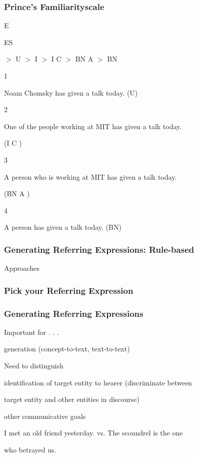 \documentclass[compress,color=usenames]{beamer}
\begin{document}
\begin{frame}
\frametitle{Prince's Familiarityscale}

E

ES

$>$ U $>$ I $>$ I C $>$ BN A $>$ BN

1

Noam Chomsky has given a talk today. (U)

2

One of the people working at MIT has given a talk today.

(I C )

3

A person who is working at MIT has given a talk today.

(BN A )

4

A person has given a talk today. (BN)

\end{frame}

\begin{frame}
\frametitle{Generating Referring Expressions: Rule-based}

Approaches

\end{frame}

\begin{frame}
\frametitle{Pick your Referring Expression}

\end{frame}

\begin{frame}
\frametitle{Generating Referring Expressions}

Important for . . .

generation (concept-to-text, text-to-text)

Need to distinguish

identiﬁcation of target entity to hearer (discriminate between

target entity and other entities in discourse)

other communicative goals

I met an old friend yesterday. vs. The scoundrel is the one

who betrayed us.

\end{frame}
\end{document}
